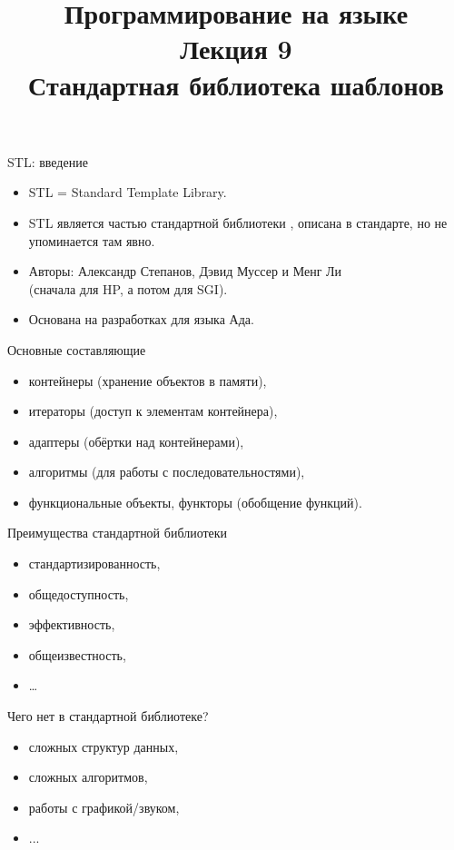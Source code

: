 \documentclass[aspectration=1610,t]{beamer}
\title{{\bf Программирование на языке \langcpp\protect\\Лекция
9\protect\vspace{1em}\\}Стандартная библиотека шаблонов}
\begin{document}
\begin{frame} 
  \titlepage
\end{frame}

\begin{frame}{STL: введение}
    \begin{itemize}
        \item STL = Standard Template Library.
        
        \item STL является частью стандартной библиотеки \langcpp, описана в стандарте, но не упоминается там явно.
            
        \item Авторы: Александр Степанов, Дэвид Муссер и Менг Ли\\ 
            (сначала для HP, а потом для SGI).

        \item Основана на разработках для языка Ада.
    \end{itemize}
\pause
\begin{block}{Основные составляющие}
    \begin{itemize}
        \item контейнеры (хранение объектов в памяти),
        \item итераторы (доступ к элементам контейнера),
        \item адаптеры (обёртки над контейнерами),
        \item алгоритмы (для работы с последовательностями),
        \item функциональные объекты, функторы (обобщение функций).
    \end{itemize}
\end{block}
\end{frame}

\begin{frame}{Преимущества стандартной библиотеки}{}
    \begin{itemize}
        \item стандартизированность,
        \item общедоступность,
        \item эффективность,
        \item общеизвестность,
        \item \dots
    \end{itemize}
\pause
\begin{block}{Чего нет в стандартной библиотеке?}
    \begin{itemize}
        \item сложных структур данных,
        \item сложных алгоритмов,
        \item работы с графикой/звуком,
        \item ...
    \end{itemize}
\end{block}
\end{frame}
\end{document}
